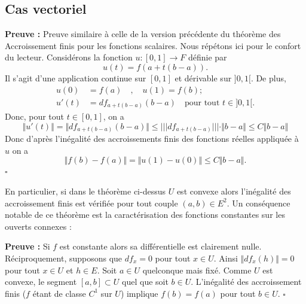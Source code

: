 \documentclass{article}
\begin{document}
\subsection{Cas vectoriel}


\noindent\textbf{Preuve :} Preuve similaire à celle de la version précédente du théorème des Accroissement finis pour les fonctions scalaires. Nous répétons ici pour le confort du lecteur. Considérons la fonction $u : [0,1] \longrightarrow F$ définie par
\[u(t) = f(a + t(b-a)).\]
Il s'agit d'une application continue sur $[0,1]$ et dérivable sur $]0,1[$. De plus,
\begin{align*}
u(0) &= f(a) \quad,\quad u(1) = f(b); \\
u'(t) &= df_{a+t(b-a)}(b-a) \quad \text{pour tout } t \in ]0,1[.
\end{align*}
Donc, pour tout $t \in [0,1]$, on a
\[\Vert{}u'(t)\Vert{} = \Vert{}df_{a+t(b-a)}(b-a)\Vert{} \le \vert{}\vert{}\vert{} df_{a+t(b-a)} \vert{}\vert{}\vert{} \cdot \Vert{}b-a\Vert{} \le C\Vert{}b-a\Vert{}\]
Donc d'après l'inégalité des accroissements finis des fonctions réelles appliquée à $u$ on a
\[\Vert{}f(b) - f(a)\Vert{} = \Vert{}u(1) - u(0)\Vert{} \le C\Vert{}b-a\Vert{}.\]
\hfill $\square$

En particulier, si dans le théorème ci-dessus $U$ est convexe alors l'inégalité des accroissement finis est vérifiée pour tout couple $(a,b) \in E^2$. Un conséquence notable de ce théorème est la caractérisation des fonctions constantes sur les ouverts connexes :


\noindent\textbf{Preuve :} Si $f$ est constante alors sa différentielle est clairement nulle. Réciproquement, supposons que $df_x = 0$ pour tout $x \in U$. Ainsi $\Vert{}df_x(h)\Vert{} = 0$ pour tout $x \in U$ et $h \in E$. Soit $a \in U$ quelconque mais fixé. Comme $U$ est convexe, le segment $[a,b] \subset U$ quel que soit $b \in U$. L'inégalité des accroissement finis ($f$ étant de classe $C^1$ sur $U$) implique $f(b) = f(a)$ pour tout $b \in U$. \hfill $\square$
\end{document}
